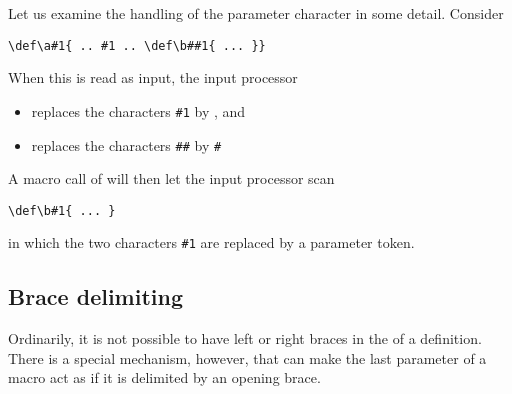 Let us examine the handling of the parameter character
in some detail.
Consider
\begin{verbatim}
\def\a#1{ .. #1 .. \def\b##1{ ... }}
\end{verbatim}
When this is read as input, the input processor
\begin{itemize}
\item replaces the characters \verb>#1> by , and
\item replaces the characters \verb>##> by \verb>#>\end{itemize}
A macro call of  will then let the input processor scan
\begin{verbatim}
\def\b#1{ ... }
\end{verbatim}
in which the two characters \verb>#1> are
\alt
replaced by a parameter token.

\subsection{Brace delimiting}

Ordinarily, it is not possible to have left or right
braces in the  of a definition.
There is a special mechanism, however, that can make
the last parameter of a macro act as if it is delimited
by an opening brace. 

